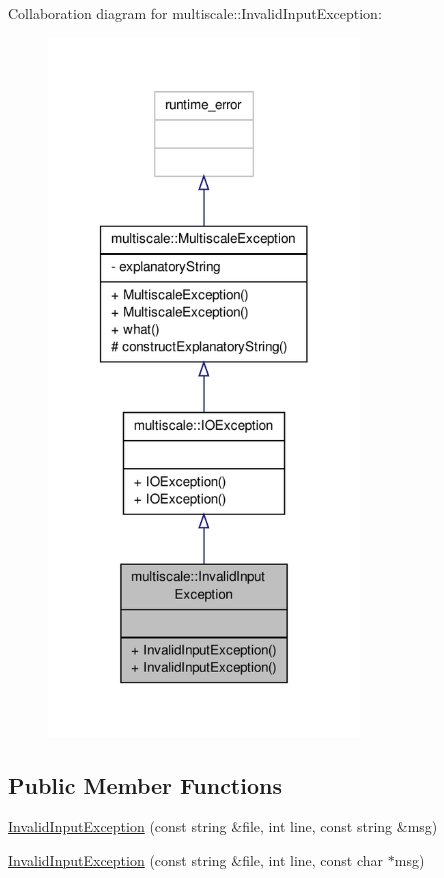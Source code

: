Collaboration diagram for multiscale\-:\-:Invalid\-Input\-Exception\-:
\nopagebreak
\begin{figure}[H]
\begin{center}
\leavevmode
\includegraphics[width=234pt]{classmultiscale_1_1InvalidInputException__coll__graph}
\end{center}
\end{figure}
\subsection*{Public Member Functions}
\begin{DoxyCompactItemize}
\item 
\hyperlink{classmultiscale_1_1InvalidInputException_aea7260856bd45bd4443d7626de243b72}{Invalid\-Input\-Exception} (const string \&file, int line, const string \&msg)
\item 
\hyperlink{classmultiscale_1_1InvalidInputException_af12fa935cdc2aacbba5ea8cda0ef8df1}{Invalid\-Input\-Exception} (const string \&file, int line, const char $\ast$msg)
\end{DoxyCompactItemize}
